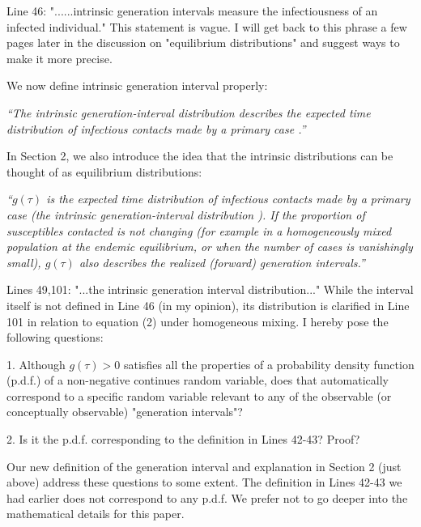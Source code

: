\documentclass[12pt]{article}
\newcommand{\revtext}{\textsf}
\newcommand{\newtext}[1]{\textsl{``#1''}}
\begin{document}
\revtext{Line 46: "......intrinsic generation intervals measure the infectiousness of an
infected individual." This statement is vague. I will get back to this phrase
a few pages later in the discussion on "equilibrium distributions" and
suggest ways to make it more precise.}

We now define intrinsic generation interval properly:

\newtext{The \emph{intrinsic} generation-interval distribution describes the expected time distribution of infectious contacts made by a primary case \citep{champredon2015intrinsic}.}

In Section 2, we also introduce the idea that the intrinsic distributions can be thought of as equilibrium distributions:

\newtext{$g(\tau)$ is the expected time distribution of infectious contacts made by a primary case (the intrinsic generation-interval distribution \citep{champredon2015intrinsic}).
If the proportion of susceptibles contacted is not changing (for example in a homogeneously mixed population at the endemic equilibrium, or when the number of cases is vanishingly small), $g(\tau)$ also describes the realized (forward) generation intervals.}

\revtext{Lines 49,101: "...the intrinsic generation interval distribution..." While the
interval itself is not defined in Line 46 (in my opinion), its distribution is
clarified in Line 101 in relation to equation (2) under homogeneous mixing.
I hereby pose the following questions:}

\revtext{
1. Although $g(\tau) > 0$ satisfies all the properties of a probability density
function (p.d.f.) of a non-negative continues random variable, does that
automatically correspond to a specific random variable relevant to any of
the observable (or conceptually observable) "generation intervals"?
}

\revtext{
2. Is it the p.d.f. corresponding to the definition in Lines 42-43? Proof?
}

Our new definition of the generation interval and explanation in Section 2 (just above) address these questions to some extent. 
The definition in Lines 42-43 we had earlier does not correspond to any p.d.f.
We prefer not to go deeper into the mathematical details for this paper.
\end{document}
